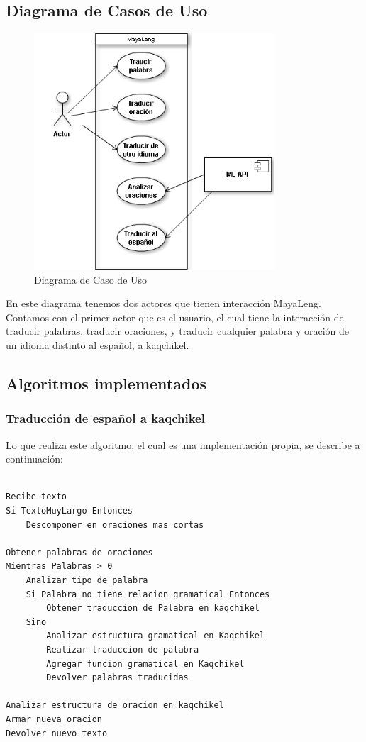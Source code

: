 \documentclass[a4paper,openright,11pt]{article}
\begin{document}
\newpage
\subsection{Diagrama de Casos de Uso}
\begin{figure}[h]
	\centering
	\includegraphics[width=0.8\textwidth]{casouso}
	\caption{Diagrama de Caso de Uso}
	\label{fig:caso}
\end{figure}
En este diagrama tenemos dos actores que tienen interacción MayaLeng. Contamos con el primer actor que es el usuario, el cual tiene la interacción de traducir palabras, traducir oraciones, y traducir cualquier palabra y oración de un idioma distinto al español, a kaqchikel.
\newpage

\subsection{Algoritmos implementados}
\subsubsection{Traducción de español a kaqchikel}
Lo que realiza este algoritmo, el cual es una implementación propia, se describe a continuación:

\begin{lstlisting}

Recibe texto
Si TextoMuyLargo Entonces
	Descomponer en oraciones mas cortas
	
Obtener palabras de oraciones
Mientras Palabras > 0
	Analizar tipo de palabra
	Si Palabra no tiene relacion gramatical Entonces
		Obtener traduccion de Palabra en kaqchikel
	Sino
		Analizar estructura gramatical en Kaqchikel
		Realizar traduccion de palabra
		Agregar funcion gramatical en Kaqchikel
		Devolver palabras traducidas
	
Analizar estructura de oracion en kaqchikel
Armar nueva oracion
Devolver nuevo texto

\end{lstlisting}
\newpage
\end{document}
